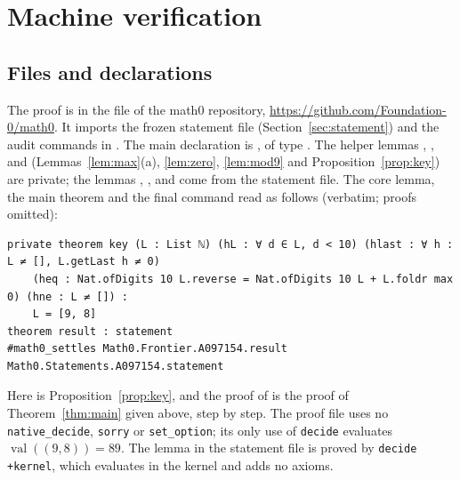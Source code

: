 \documentclass[11pt]{amsart}
\theoremstyle{plain}
\theoremstyle{definition}
\newcommand{\val}{\operatorname{val}}
\begin{document}
\section{Machine verification}\label{sec:lean}

\subsection*{Files and declarations}
The proof is in the file  of the math0 repository, \url{https://github.com/Foundation-0/math0}. It imports the frozen statement file  (Section~\ref{sec:statement}) and the audit commands in . The main declaration is , of type . The helper lemmas , ,  and  (Lemmas~\ref{lem:max}(a), \ref{lem:zero}, \ref{lem:mod9} and Proposition~\ref{prop:key}) are private; the lemmas , ,  and  come from the statement file. The core lemma, the main theorem and the final command read as follows (verbatim; proofs omitted):
\begin{lstlisting}[basicstyle=\ttfamily\scriptsize]
private theorem key (L : List ℕ) (hL : ∀ d ∈ L, d < 10) (hlast : ∀ h : L ≠ [], L.getLast h ≠ 0)
    (heq : Nat.ofDigits 10 L.reverse = Nat.ofDigits 10 L + L.foldr max 0) (hne : L ≠ []) :
    L = [9, 8]
theorem result : statement
#math0_settles Math0.Frontier.A097154.result Math0.Statements.A097154.statement
\end{lstlisting}
Here  is Proposition~\ref{prop:key}, and the proof of  is the proof of Theorem~\ref{thm:main} given above, step by step. The proof file uses no \texttt{native\_decide}, \texttt{sorry} or \texttt{set\_option}; its only use of \texttt{decide} evaluates $\val((9,8))=89$. The lemma  in the statement file is proved by \texttt{decide +kernel}, which evaluates in the kernel and adds no axioms.
\end{document}
